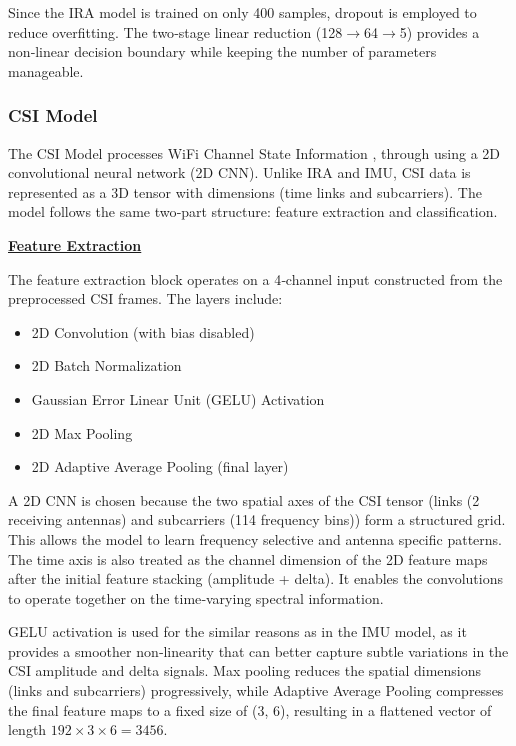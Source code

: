 Since the IRA model is trained on only 400 samples, dropout is employed to reduce overfitting. The two‑stage linear reduction (128\(\rightarrow\)64\(\rightarrow\)5) provides a non‑linear decision boundary while keeping the number of parameters manageable.


\subsubsection{CSI Model}

The CSI Model processes WiFi Channel State Information , through using a 2D convolutional neural network (2D CNN). Unlike IRA and IMU, CSI data is represented as a 3D tensor with dimensions (time links and subcarriers). The model follows the same two‑part structure: feature extraction and classification.

\textbf{\underline{Feature Extraction}}

The feature extraction block operates on a 4‑channel input constructed from the preprocessed CSI frames. The layers include:
\begin{itemize}
    \item 2D Convolution (with bias disabled)
    \item 2D Batch Normalization
    \item Gaussian Error Linear Unit (GELU) Activation
    \item 2D Max Pooling
    \item 2D Adaptive Average Pooling (final layer)
\end{itemize}

A 2D CNN is chosen because the two spatial axes of the CSI tensor (links (2 receiving antennas) and subcarriers (114 frequency bins)) form a structured grid. This allows the model to learn frequency selective and antenna specific patterns. The time axis is also treated as the channel dimension of the 2D feature maps after the initial feature stacking (amplitude + delta). It enables the convolutions to operate together on the time‑varying spectral information.

GELU activation is used for the similar reasons as in the IMU model, as it provides a smoother non‑linearity that can better capture subtle variations in the CSI amplitude and delta signals. Max pooling reduces the spatial dimensions (links and subcarriers) progressively, while Adaptive Average Pooling compresses the final feature maps to a fixed size of (3, 6), resulting in a flattened vector of length \(192 \times 3 \times 6 = 3456\).

